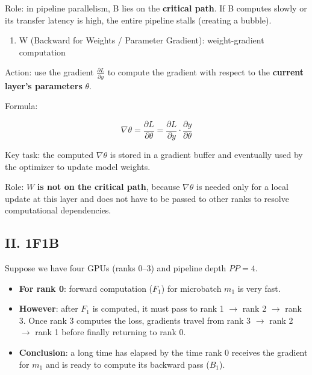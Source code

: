 Role: in pipeline parallelism, B lies on the \textbf{critical path}. If B computes slowly or its transfer latency is high, the entire pipeline stalls (creating a bubble).

\begin{enumerate}
\def\labelenumi{\arabic{enumi}.}
\setcounter{enumi}{2}
\tightlist
\item
  W (Backward for Weights / Parameter Gradient): weight-gradient computation
\end{enumerate}

Action: use the gradient \(\frac{\partial L}{\partial y}\) to compute the gradient with respect to the \textbf{current layer's parameters} \(\theta\).

Formula:

\[
\nabla \theta = \frac{\partial L}{\partial \theta} = \frac{\partial L}{\partial y} \cdot \frac{\partial y}{\partial \theta}
\]

Key task: the computed \(\nabla \theta\) is stored in a gradient buffer and eventually used by the optimizer to update model weights.

Role: \(W\) \textbf{is not on the critical path}, because \(\nabla \theta\) is needed only for a local update at this layer and does not have to be passed to other ranks to resolve computational dependencies.

\hypertarget{ii.-1f1b}{%
\subsection{II. 1F1B}\label{ii.-1f1b}}

Suppose we have four GPUs (ranks 0--3) and pipeline depth \(PP = 4\).

\begin{itemize}
\tightlist
\item
  \textbf{For rank 0}: forward computation (\(F_1\)) for microbatch \(m_1\) is very fast.
\item
  \textbf{However}: after \(F_1\) is computed, it must pass to rank 1 \(\to\) rank 2 \(\to\) rank 3. Once rank 3 computes the loss, gradients travel from rank 3 \(\to\) rank 2 \(\to\) rank 1 before finally returning to rank 0.
\item
  \textbf{Conclusion}: a long time has elapsed by the time rank 0 receives the gradient for \(m_1\) and is ready to compute its backward pass (\(B_1\)).
\end{itemize}

